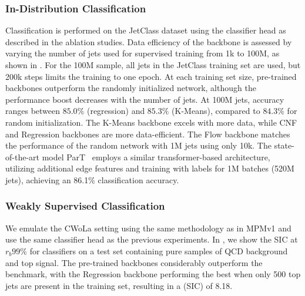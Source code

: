 \subsubsection{In-Distribution Classification}

Classification is performed on the JetClass dataset using the classifier head as described in the ablation studies.
Data efficiency of the backbone is assessed by varying the number of jets used for supervised training from 1k to 100M, as shown in .
For the 100M sample, all jets in the JetClass training set are used, but 200k steps limits the training to one epoch.
At each training set size, pre-trained backbones outperform the randomly initialized network, although the performance boost decreases with the number of jets.
At 100M jets, accuracy ranges between $85.0\%$ (regression) and $85.3\%$ (K-Means), compared to $84.3\%$ for random initialization.
The K-Means backbone excels with more data, while CNF and Regression backbones are more data-efficient.
The Flow backbone matches the performance of the random network with 1M jets using only 10k.
The state-of-the-art model ParT~\cite{ParticleTransformerJet} employs a similar transformer-based architecture, utilizing additional edge features and training with labels for 1M batches (520M jets), achieving an 86.1\% classification accuracy.

\subsubsection{Weakly Supervised Classification}

We emulate the CWoLa setting using the same methodology as in MPMv1 and use the same classifier head as the previous experiments.
In , we show the SIC at $r_b99\%$ for classifiers on a test set containing pure samples of QCD background and top signal.
The pre-trained backbones considerably outperform the benchmark, with the Regression backbone performing the best when only 500 top jets are present in the training set, resulting in a (SIC) of 8.18.

